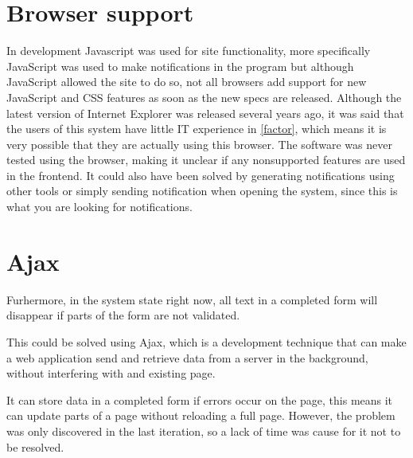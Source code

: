 \section{Browser support}
In development Javascript was used for site functionality, more specifically JavaScript was used to make notifications in the program but although JavaScript allowed the site to do so, not all browsers add support for new JavaScript and CSS features as soon as the new specs are released.
Although the latest version of Internet Explorer was released several years ago, it was said that the users of this system have little IT experience in \cref{factor}, which means it is very possible that they are actually using this browser.
The software was never tested using the browser, making it unclear if any nonsupported features are used in the frontend.
It could also have been solved by generating notifications using other tools or simply sending notification when opening the system, since this is what you are looking for notifications.

\section{Ajax}

Furhermore, in the system state right now, all text in a completed form will disappear if parts of the form are not validated.

This could be solved using Ajax, which is a development technique that can make a web application send and retrieve data from a server in the background, without interfering with and existing page.

It can store data in a completed form if errors occur on the page, this means it can update parts of a page without reloading a full page.
However, the problem was only discovered in the last iteration, so a lack of time was cause for it not to be resolved.
